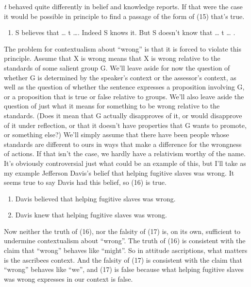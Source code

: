 \documentclass[
  10pt,
  letterpaper,
  DIV=11,
  numbers=noendperiod,
  twoside]{scrartcl}
\providecommand{\tightlist}{%
  \setlength{\itemsep}{0pt}\setlength{\parskip}{0pt}}\usepackage{longtable,booktabs,array}
\begin{document}
\emph{t} behaved quite differently in belief and knowledge reports. If
that were the case it would be possible in principle to find a passage
of the form of (15) that's true.

\begin{enumerate}
\def\labelenumi{\arabic{enumi}.}
\setcounter{enumi}{14}
\tightlist
\item
  S believes that \ldots{} t \ldots. Indeed S knows it. But S doesn't
  know that \ldots{} t \ldots{} .
\end{enumerate}

The problem for contextualism about ``wrong'' is that it is forced to
violate this principle. Assume that X is wrong means that X is wrong
relative to the standards of some salient group G. We'll leave aside for
now the question of whether G is determined by the speaker's context or
the assessor's context, as well as the question of whether the sentence
expresses a proposition involving G, or a proposition that is true or
false relative to groups. We'll also leave aside the question of just
what it means for something to be wrong relative to the standards. (Does
it mean that G actually disapproves of it, or would disapprove of it
under reflection, or that it doesn't have properties that G wants to
promote, or something else?) We'll simply assume that there have been
people whose standards are different to ours in ways that make a
difference for the wrongness of actions. If that isn't the case, we
hardly have a relativism worthy of the name. It's obviously
controversial just what could be an example of this, but I'll take as my
example Jefferson Davis's belief that helping fugitive slaves was wrong.
It seems true to say Davis had this belief, so (16) is true.

\begin{enumerate}
\def\labelenumi{\arabic{enumi}.}
\setcounter{enumi}{15}
\tightlist
\item
  Davis believed that helping fugitive slaves was wrong.
\item
  Davis knew that helping fugitive slaves was wrong.
\end{enumerate}

Now neither the truth of (16), nor the falsity of (17) is, on its own,
sufficient to undermine contextualism about ``wrong''. The truth of (16)
is consistent with the claim that ``wrong'' behaves like ``might''. So
in attitude ascriptions, what matters is the ascribees context. And the
falsity of (17) is consistent with the claim that ``wrong'' behaves like
``we'', and (17) is false because what helping fugitive slaves was wrong
expresses in our context is false.
\end{document}
